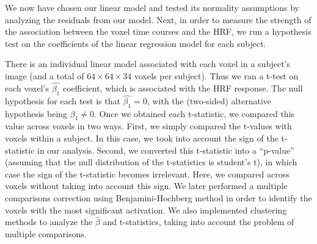 
\par \indent We now have chosen our linear model and tested its normality 
assumptions by analyzing the residuals from our model. Next, in order to 
measure the strength of the association between the voxel time courses and the 
HRF, we run a hypothesis test on the coefficients of the linear regression 
model for each subject. 

\par There is an individual linear model associated with each voxel in a 
subject’s image (and a total of $64 \times 64 \times 34$ voxels per subject). 
Thus we ran a t-test on each voxel's $\hat{\beta_1}$ coefficient, which is 
associated with the HRF response. The null hypothesis for each test is that 
$\hat{\beta_1}=0$, with the (two-sided) alternative hypothesis being 
$\beta_1 \neq 0$. Once we obtained each t-statistic, we compared this value 
across voxels in two ways. First, we simply compared the t-values with voxels 
within a subject. In this case, we took into account the sign of the 
t-statistic in our analysis. Second, we converted this t-statistic into a 
``p-value'' (assuming that the null distribution of the t-statistics is 
student's t), in which case the sign of the t-statistic becomes 
irrelevant. Here, we compared across voxels without taking into account this 
sign. We later performed a multiple comparisons correction using
Benjamini-Hochberg method in order to identify the voxels with the most 
significant activation. We also implemented clustering methods to analyze the 
$\hat{\beta}$ and t-statistics, taking into account the problem of multiple 
comparisons.

